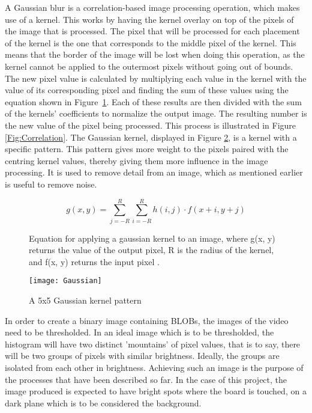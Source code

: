 A Gaussian blur is a correlation-based image processing operation, which makes use of a kernel. This works by having the kernel overlay on top of the pixels of the image that is processed. The pixel that will be processed for each placement of the kernel is the one that corresponds to the middle pixel of the kernel. This means that the border of the image will be lost when doing this operation, as the kernel cannot be applied to the outermost pixels without going out of bounds. The new pixel value is calculated by multiplying each value in the kernel with the value of its corresponding pixel and finding the sum of these values using the equation shown in Figure~\ref{fig:gaussianEquation}. Each of these results are then divided with the sum of the kernels' coefficients to normalize the output image. The resulting number is the new value of the pixel being processed. This process is illustrated in Figure \ref{Fig:Correlation}. The Gaussian kernel, displayed in Figure \ref{Fig:Gaussian}, is a kernel with a specific pattern. This pattern gives more weight to the pixels paired with the centring kernel values, thereby giving them more influence in the image processing. It is used to remove detail from an image, which as mentioned earlier is useful to remove noise.

\begin{figure}
	\centering
	\begin{displaymath}
	g(x,y) = \sum^R_{j=-R} \sum^R_{i=-R} h(i, j) \cdot f(x + i, y + j)
	\end{displaymath}
	\caption{Equation for applying a gaussian kernel to an image, where g(x, y) returns the value of the output pixel, R is the radius of the kernel, and f(x, y) returns the input pixel \citep{moeslund_introduction_2012}. \label{fig:gaussianEquation}}
\end{figure}

\begin{figure}[h]
\begin{center}
 \texttt{[image: Gaussian]}
  \end{center}
\caption{A 5x5 Gaussian kernel pattern \label{Fig:Gaussian}\citep{moeslund_introduction_2012}}
\end{figure}

In order to create a binary image containing BLOBs, the images of the video need to be thresholded. In an ideal image which is to be thresholded, the histogram will have two distinct 'mountains' of pixel values, that is to say, there will be two groups of pixels with similar brightness. Ideally, the groups are isolated from each other in brightness. Achieving such an image is the purpose of the processes that have been described so far. In the case of this project, the image produced is expected to have bright spots where the board is touched, on a dark plane which is to be considered the background.

